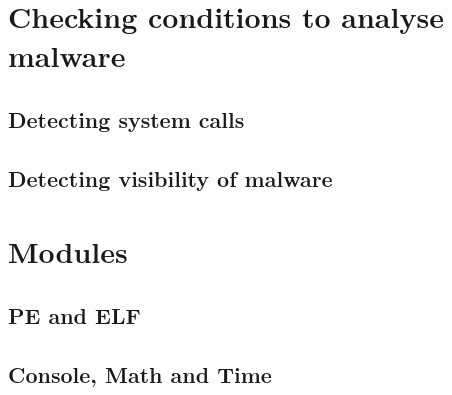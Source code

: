\documentclass{article}
\begin{document}


\section{ Checking conditions to analyse malware }

\subsection{ Detecting system calls }



\subsection{ Detecting visibility of malware }




\section{Modules}

\subsection{PE and ELF}




\subsection{Console, Math and Time}






\end{document}
